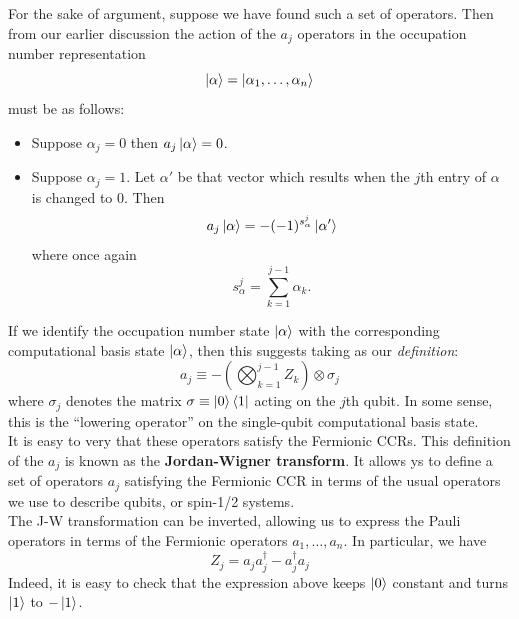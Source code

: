 \documentclass{book}
\theoremstyle{definition}
\newcommand{\al}{\alpha}
\newcommand{\lp}{\left(}
\newcommand{\rp}{\right)}
\begin{document}
For the sake of argument, suppose we have found such a set of operators. Then from our earlier discussion the action of the $a_j$ operators in the occupation number representation
\begin{equation}
\ket{\al} = \ket{\al_1,\dots,\al_n}
\end{equation}
must be as follows:
\begin{itemize}
	\item Suppose $\al_j = 0$ then $a_j \ket{\al} = 0$.
	\item Suppose $\al_j = 1$. Let $\al'$ be that vector which results when the $j$th entry of $\al$ is changed to $0$. Then 
	\begin{equation}
	a_j \ket{\al} = -(-1)^{s^j_\al} \ket{\al'}
	\end{equation}
	where once again
	\begin{equation}
	s^j_\al = \sum^{j-1}_{k=1}\al_k.
	\end{equation}
\end{itemize}

If we identify the occupation number state $\ket{\al}$ with the corresponding computational basis state $\ket{\al}$, then this suggests taking as our \textit{definition}:
\begin{equation}
\boxed{a_j \equiv -\lp \bigotimes^{j-1}_{k=1} Z_k \rp \otimes \sigma_j}
\end{equation}
where $\sigma_j$ denotes the matrix $\sigma \equiv \ket{0}\bra{1}$ acting on the $j$th qubit. In some sense, this is the ``lowering operator'' on the single-qubit computational basis state. \\

It is easy to very that these operators satisfy the Fermionic CCRs. This definition of the $a_j$ is known as the \textbf{Jordan-Wigner transform}. It allows ys to define a set of operators $a_j$ satisfying the Fermionic CCR in terms of the usual operators we use to describe qubits, or spin-1/2 systems. \\




The J-W transformation can be inverted, allowing us to express the Pauli operators in terms of the Fermionic operators $a_1,\dots,a_n$. In particular, we have
\begin{equation}
\boxed{Z_j = a_j a^\dagger_j - a_j^\dagger a_j}
\end{equation}
Indeed, it is easy to check that the expression above keeps $\ket{0}$ constant and turns $\ket{1}$ to $-\ket{1}$.\\
\end{document}
